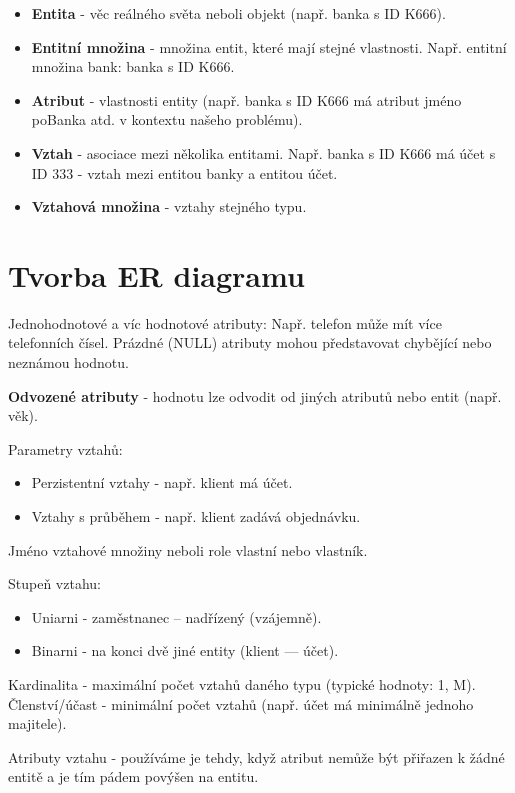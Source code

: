 \documentclass{article}
\begin{document}
\begin{itemize}
    \item \textbf{Entita} - věc reálného světa neboli objekt (např. banka s ID K666).
    \item \textbf{Entitní množina} - množina entit, které mají stejné vlastnosti.
    Např. entitní množina bank: banka s ID K666.
    \item \textbf{Atribut} - vlastnosti entity (např. banka s ID K666 má atribut jméno poBanka atd. v kontextu našeho problému).
    \item \textbf{Vztah} - asociace mezi několika entitami.
    Např. banka s ID K666 má účet s ID 333 - vztah mezi entitou banky a entitou účet.
    \item \textbf{Vztahová množina} - vztahy stejného typu.
\end{itemize}

\section{Tvorba ER diagramu}

Jednohodnotové a víc hodnotové atributy:
Např. telefon může mít více telefonních čísel.
Prázdné (NULL) atributy mohou představovat chybějící nebo neznámou hodnotu.

\textbf{Odvozené atributy} - hodnotu lze odvodit od jiných atributů nebo entit (např. věk).

Parametry vztahů:
\begin{itemize}
    \item Perzistentní vztahy - např. klient má účet.
    \item Vztahy s průběhem - např. klient zadává objednávku.
\end{itemize}

Jméno vztahové množiny neboli role vlastní nebo vlastník.

Stupeň vztahu:
\begin{itemize}
    \item Uniarni - zaměstnanec -- nadřízený (vzájemně).
    \item Binarni - na konci dvě jiné entity (klient --- účet).
\end{itemize}

Kardinalita - maximální počet vztahů daného typu (typické hodnoty: 1, M).
Členství/účast - minimální počet vztahů (např. účet má minimálně jednoho majitele).

Atributy vztahu - používáme je tehdy, když atribut nemůže být přiřazen k žádné entitě a je tím pádem povýšen na entitu.
\end{document}
